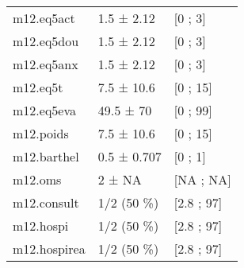 \documentclass[]{article}
\begin{document}
\begin{longtable}{lll}
  m12.eq5act & 1.5 ± 2.12 & [0 ; 3] \\ 
  m12.eq5dou & 1.5 ± 2.12 & [0 ; 3] \\ 
  m12.eq5anx & 1.5 ± 2.12 & [0 ; 3] \\ 
  m12.eq5t & 7.5 ± 10.6 & [0 ; 15] \\ 
  m12.eq5eva & 49.5 ± 70 & [0 ; 99] \\ 
  m12.poids & 7.5 ± 10.6 & [0 ; 15] \\ 
  m12.barthel & 0.5 ± 0.707 & [0 ; 1] \\ 
  m12.oms & 2 ± NA & [NA ; NA] \\ 
  m12.consult & 1/2 (50 \%) &  [2.8 ; 97] \\ 
  m12.hospi & 1/2 (50 \%) &  [2.8 ; 97] \\ 
  m12.hospirea & 1/2 (50 \%) &  [2.8 ; 97] \\ 
  \end{longtable}
\end{document}
